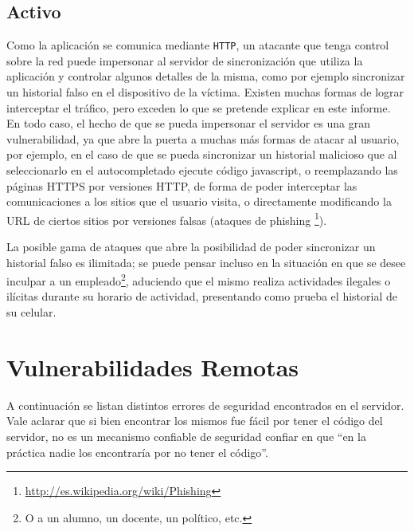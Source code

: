 \documentclass[11pt, a4paper, twoside]{article}
\begin{document}
\subsection{Activo}
Como la aplicación se comunica mediante \texttt{HTTP}, un atacante que tenga control sobre la red puede impersonar al servidor de sincronización que utiliza la aplicación y controlar algunos detalles de la misma, como por ejemplo sincronizar un historial falso en el dispositivo de la víctima. Existen muchas formas de lograr interceptar el tráfico, pero exceden lo que se pretende explicar en este informe. En todo caso, el hecho de que se pueda impersonar el servidor es una gran vulnerabilidad, ya que abre la puerta a muchas más formas de atacar al usuario, por ejemplo, en el caso de que se pueda sincronizar un historial malicioso que al seleccionarlo en el autocompletado ejecute código javascript, o reemplazando las páginas HTTPS por versiones HTTP, de forma de poder interceptar las comunicaciones a los sitios que el usuario visita, o directamente modificando la URL de ciertos sitios por versiones falsas (ataques de phishing \footnote{\url{http://es.wikipedia.org/wiki/Phishing}}). 

La posible gama de ataques que abre la posibilidad de poder sincronizar un historial falso es ilimitada; se puede pensar incluso en la situación en que se desee inculpar a un empleado\footnote{O a un alumno, un docente, un político, etc.}, aduciendo que el mismo realiza actividades ilegales o ilícitas durante su horario de actividad, presentando como prueba el historial de su celular.

%
%
\clearpage
{}
\section{Vulnerabilidades Remotas}

A continuación se listan distintos errores de seguridad encontrados en el servidor. Vale aclarar que si bien encontrar los mismos fue fácil por tener el código del servidor, no es un mecanismo confiable de seguridad confiar en que ``en la práctica nadie los encontraría por no tener el código''.
\end{document}
